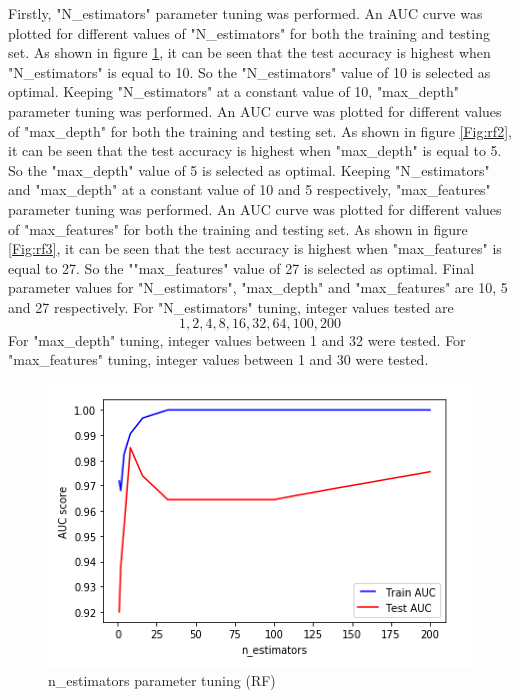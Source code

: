 \documentclass[journal]{IEEEtran}
\begin{document}
Firstly, "N\_estimators" parameter tuning was performed. An AUC curve was plotted for different values of "N\_estimators" for both the training and testing set. As shown in figure \ref{Fig:rf1}, it can be seen that the test accuracy is highest when "N\_estimators" is equal to 10. So the "N\_estimators" value of 10 is selected as optimal. Keeping  "N\_estimators"  at a constant value of 10,  "max\_depth" parameter tuning was performed. An AUC curve was plotted for different values of "max\_depth" for both the training and testing set. As shown in figure \ref{Fig:rf2}, it can be seen that the test accuracy is highest when "max\_depth" is equal to 5. So the "max\_depth" value of 5 is selected as optimal. Keeping  "N\_estimators"  and "max\_depth" at a constant value of 10 and 5 respectively,  "max\_features" parameter tuning was performed. An AUC curve was plotted for different values of "max\_features" for both the training and testing set. As shown in figure \ref{Fig:rf3}, it can be seen that the test accuracy is highest when "max\_features" is equal to 27. So the ""max\_features" value of 27 is selected as optimal. Final parameter values for  "N\_estimators", "max\_depth" and  "max\_features"  are 10, 5 and 27 respectively. For "N\_estimators" tuning, integer values tested are \[1, 2, 4, 8, 16, 32, 64, 100, 200\]For  "max\_depth" tuning, integer values between 1 and 32 were tested. For "max\_features" tuning, integer values between 1 and 30 were tested.


\begin{figure}[htbp]
	\centering
	\includegraphics[width=\linewidth]{nestimator_RF.png}
	\caption{n\_estimators parameter tuning (RF)}
	\label{Fig:rf1}
\end{figure}
 
\end{document}

